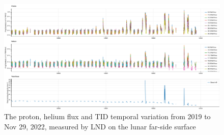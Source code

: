 \begin{figure}[!htb]
    \centering
    \includegraphics[angle = 90, width =\textwidth, height = 0.95\textheight]{images/LND-proton-helium-TID.png}
    \caption[The overview of the proton, helium flux and \ac{TID} measured by \ac{LND}]{The proton, helium flux and \ac{TID} temporal variation from 2019 to Nov 29, 2022, measured by \ac{LND} on the lunar far-side surface}
    \label{Fig:appendix_LND_proton_helium_TID}
\end{figure}
\clearpage
